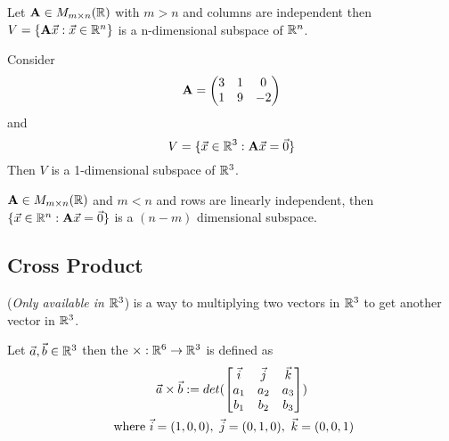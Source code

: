 \documentclass[]{article}
\begin{document}
        \begin{theorem}
            Let $\textbf{A} \in M_{{m} \times {n}}(\mathbb{R})$ with $m > n$ and columns are independent then $V = \{\textbf{A}\vec{x}: \vec{x} \in \mathbb{R}^n\}$ is a n-dimensional subspace of $\mathbb{R}^n$.
        \end{theorem}
        
        \begin{example} 
            Consider 
            \[
                \textbf{A} = \begin{pmatrix}
                    3 & 1 & 0 \\ 1 & 9 & -2
                \end{pmatrix}
            \] and 
            \[
                V = \{\vec{x} \in \mathbb{R}^3: \textbf{A} \vec{x} = \vec{0}\}
            \]
            Then $V$ is a 1-dimensional subspace of $\mathbb{R}^3$.
        \end{example}
        
        \begin{theorem}
            $\textbf{A} \in M_{{m} \times {n}}(\mathbb{R})$ and $m < n$ and rows are linearly independent, then $\{ \vec{x} \in \mathbb{R}^n: \textbf{A}\vec{x} = \vec{0} \}$ is a $(n-m)$ dimensional subspace.
        \end{theorem}
        
        \subsection{Cross Product}
            (\emph{Only available in $\mathbb{R}^3$}) is a way to multiplying two vectors in $\mathbb{R}^3$ to get another vector in $\mathbb{R}^3$.
            \begin{defn}
                Let $\vec{a}, \vec{b} \in \mathbb{R}^3$ then the  ${\times}: {\mathbb{R}^6} \to {\mathbb{R}^3}$ is defined as
                \begin{gather*}
                    \vec{a} \times \vec{b} := det(
                        \begin{bmatrix}
                            \vec{i} & \vec{j} & \vec{k} \\
                            a_1 & a_2 & a_3 \\
                            b_1 & b_2 & b_3 \\
                        \end{bmatrix}
                    ) \\
                    \tx{ where } \vec{i} = (1,0,0),\ \vec{j} = (0,1,0),\ \vec{k} = (0,0,1)
                \end{gather*}
            \end{defn}
            
\end{document}
